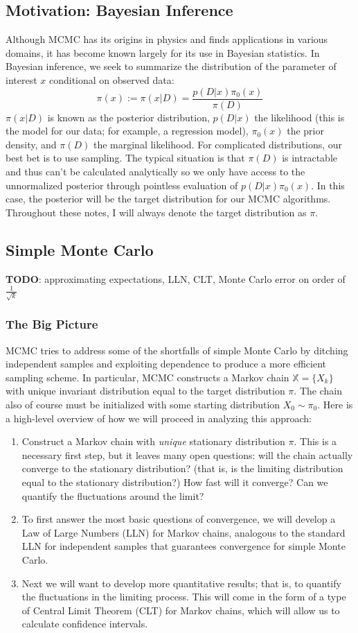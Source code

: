 \documentclass[12pt]{article}
\begin{document}
\subsection{Motivation: Bayesian Inference}
Although MCMC has its origins in physics and finds applications in various domains, it has become known largely for its use in 
Bayesian statistics. In Bayesian inference, we seek to summarize the distribution of the parameter of interest $x$ conditional on observed 
data: 
\[\pi(x) := \pi(x|D) = \frac{p(D|x)\pi_0(x)}{\pi(D)}\]
$\pi(x|D)$ is known as the posterior distribution, $p(D|x)$ the likelihood (this is the model for our data; for example, a regression model), 
$\pi_0(x)$ the prior density, and $\pi(D)$ the marginal likelihood. For complicated distributions, our best bet is to use sampling. The typical 
situation is that $\pi(D)$ is intractable and thus can't be calculated analytically so we only have access to the unnormalized posterior 
through pointless evaluation of $p(D|x)\pi_0(x)$. In this case, the posterior will be the target distribution for our MCMC algorithms. 
Throughout these notes, I will always denote the target distribution as $\pi$. 

\subsection{Simple Monte Carlo}
\textbf{TODO}: approximating expectations, LLN, CLT, Monte Carlo error on order of $\frac{1}{\sqrt{k}}$

\subsubsection{The Big Picture}
MCMC tries to address some of the shortfalls of simple Monte Carlo by ditching independent samples and exploiting dependence 
to produce a more efficient sampling scheme. In particular, MCMC constructs a Markov chain $\mathbb{X} = \{X_k\}$ with unique invariant 
distribution equal to the target distribution $\pi$. The chain also of course must be initialized with some starting distribution $X_0 \sim \pi_0$.
Here is a high-level overview of how we will proceed in analyzing this approach: 
\begin{enumerate}
\item Construct a Markov chain with \textit{unique} stationary distribution $\pi$. This is a necessary first step, but it leaves many open questions: 
will the chain actually converge to the stationary distribution? (that is, is the limiting distribution equal to the stationary distribution?) How fast will 
it converge? Can we quantify the fluctuations around the limit? 
\item To first answer the most basic questions of convergence, we will develop a Law of Large Numbers (LLN) for Markov chains, analogous to the 
standard LLN for independent samples that guarantees convergence for simple Monte Carlo. 
\item Next we will want to develop more quantitative results; that is, to quantify the fluctuations in the limiting process. This will come in the form of a 
type of Central Limit Theorem (CLT) for Markov chains, which will allow us to calculate confidence intervals. 
\end{enumerate} 
\end{document}

